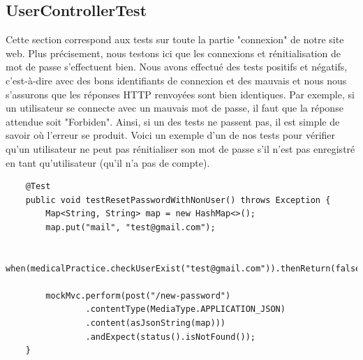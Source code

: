 \documentclass[a4paper]{report}
\begin{document}
\subsection{UserControllerTest}
Cette section correspond aux tests sur toute la partie "connexion" de notre site web. Plus précisement, nous testons ici que les connexions et rénitialisation de mot de passe s'effectuent bien.
Nous avons effectué des tests positifs et négatifs, c'est-à-dire avec des bons identifiants de connexion et des mauvais et nous nous s'assurons que les réponses HTTP renvoyées sont bien identiques.
Par exemple, si un utilisateur se connecte avec un mauvais mot de passe, il faut que la réponse attendue soit "Forbiden". Ainsi, si un des tests ne passent pas, il est simple de savoir où l'erreur se produit.
Voici un exemple d'un de nos tests pour vérifier qu'un utilisateur ne peut pas rénitialiser son mot de passe s'il n'est pas enregistré en tant qu'utilisateur (qu'il n'a pas de compte).
\begin{lstlisting}
    @Test
    public void testResetPasswordWithNonUser() throws Exception {
        Map<String, String> map = new HashMap<>();
        map.put("mail", "test@gmail.com");

        when(medicalPractice.checkUserExist("test@gmail.com")).thenReturn(false);

        mockMvc.perform(post("/new-password")
                .contentType(MediaType.APPLICATION_JSON)
                .content(asJsonString(map)))
                .andExpect(status().isNotFound());
    }
\end{lstlisting}
\end{document}
